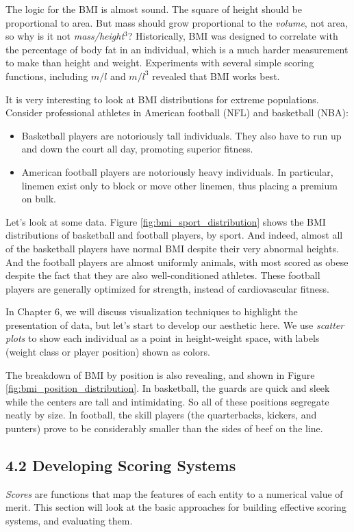 \documentclass[10pt]{article}
\begin{document}
The logic for the BMI is almost sound. The square of height should be proportional to area. But mass should grow proportional to the \textit{volume}, not area, so why is it not \textit{mass/height$^3$}? Historically, BMI was designed to correlate with the percentage of body fat in an individual, which is a much harder measurement to make than height and weight. Experiments with several simple scoring functions, including $m/l$ and $m/l^3$ revealed that BMI works best.

It is very interesting to look at BMI distributions for extreme populations. Consider professional athletes in American football (NFL) and basketball (NBA):

\begin{itemize}
  \item Basketball players are notoriously tall individuals. They also have to run up and down the court all day, promoting superior fitness.
  \item American football players are notoriously heavy individuals. In particular, linemen exist only to block or move other linemen, thus placing a premium on bulk.
\end{itemize}

Let's look at some data. Figure \ref{fig:bmi_sport_distribution} shows the BMI distributions of basketball and football players, by sport. And indeed, almost all of the basketball players have normal BMI despite their very abnormal heights. And the football players are almost uniformly animals, with most scored as obese despite the fact that they are also well-conditioned athletes. These football players are generally optimized for strength, instead of cardiovascular fitness.

In Chapter 6, we will discuss visualization techniques to highlight the presentation of data, but let's start to develop our aesthetic here. We use \textit{scatter plots} to show each individual as a point in height-weight space, with labels (weight class or player position) shown as colors.

The breakdown of BMI by position is also revealing, and shown in Figure \ref{fig:bmi_position_distribution}. In basketball, the guards are quick and sleek while the centers are tall and intimidating. So all of these positions segregate neatly by size. In football, the skill players (the quarterbacks, kickers, and punters) prove to be considerably smaller than the sides of beef on the line.

\subsection*{4.2 Developing Scoring Systems}
\textit{Scores} are functions that map the features of each entity to a numerical value of merit. This section will look at the basic approaches for building effective scoring systems, and evaluating them.
\end{document}
